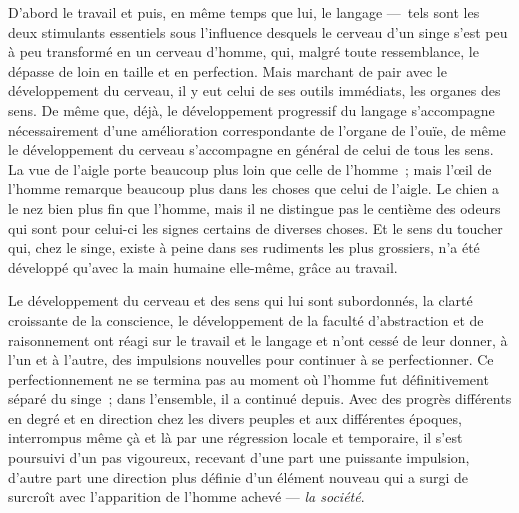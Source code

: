 \documentclass[french,twoside]{book} %
\begin{document}
D’abord le travail et puis, en même temps que lui, le langage — tels sont les deux stimulants essentiels sous l’influence desquels le cerveau d’un singe s’est peu à peu transformé en un cerveau d’homme, qui, malgré toute ressemblance, le dépasse de loin en taille et en perfection. Mais marchant de pair avec le développement du cerveau, il y eut celui de ses outils immédiats, les organes des sens. De même que, déjà, le développement progressif du langage s’accompagne nécessairement d’une amélioration correspondante de l’organe de l’ouïe, de même le développement du cerveau s’accompagne en général de celui de tous les sens. La vue de l’aigle porte beaucoup plus loin que celle de l’homme ; mais l’œil de l’homme remarque beaucoup plus dans les choses que celui de l’aigle. Le chien a le nez bien plus fin que l’homme, mais il ne distingue pas le centième des odeurs qui sont pour celui-ci les signes certains de diverses choses. Et le sens du toucher qui, chez le singe, existe à peine dans ses rudiments les plus grossiers, n’a été développé qu’avec la main humaine elle-même, grâce au travail.\par
Le développement du cerveau et des sens qui lui sont subordonnés, la clarté croissante de la conscience, le développement de la faculté d’abstraction et de raisonnement ont réagi sur le travail et le langage et n’ont cessé de leur donner, à l’un et à l’autre, des impulsions nouvelles pour continuer à se perfectionner. Ce perfectionnement ne se termina pas au moment où l’homme fut définitivement séparé du singe ; dans l’ensemble, il a continué depuis. Avec des progrès différents en degré et en direction chez les divers peuples et aux différentes époques, interrompus même çà et là par une régression locale et temporaire, il s’est poursuivi d’un pas vigoureux, recevant d’une part une puissante impulsion, d’autre part une direction plus définie d’un élément nouveau qui a surgi de surcroît avec l’apparition de l’homme achevé — \emph{la société}.\par
\end{document}
